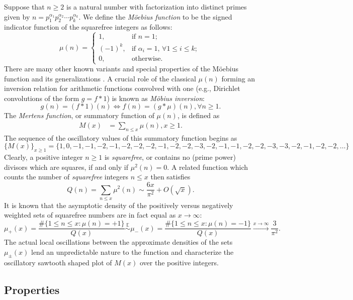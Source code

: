 \documentclass[11pt,reqno,a4letter]{article}
\numberwithin{figure}{section}
\numberwithin{table}{section}
\newcommand{\cf}{\textit{cf.\ }}
\newcommand{\seqnum}[1]{\href{http://oeis.org/#1}{\color{ProcessBlue}{\underline{#1}}}}
\theoremstyle{plain}
\numberwithin{theorem}{section}
\theoremstyle{definition}
\begin{document}
Suppose that $n \geq 2$ is a natural number with factorization into 
distinct primes given by 
$n = p_1^{\alpha_1} p_2^{\alpha_2} \cdots p_k^{\alpha_k}$. 
We define the \emph{M\"oebius function} to be the signed indicator function 
of the squarefree integers as follows: 
\[
\mu(n) = \begin{cases} 
     1, & \text{if $n = 1$; } \\ 
     (-1)^k, & \text{if $\alpha_i = 1$, $\forall 1 \leq i \leq k$; } \\ 
     0, & \text{otherwise.} 
     \end{cases} 
\]
There are many other known variants and special properties of the M\"oebius function 
and its generalizations \cite[\cf \S 2]{HANDBOOKNT-2004}. 
A crucial role of the classical $\mu(n)$ forming an inversion relation 
for arithmetic functions convolved with one (e.g., Dirichlet convolutions of the form $g = f \ast 1$) is 
known as \emph{M\"obius inversion}: 
\[
g(n) = (f \ast 1)(n) \iff f(n) = (g \ast \mu)(n), \forall n \geq 1. 
\]
The \emph{Mertens function}, or summatory function of $\mu(n)$, is defined as 
\begin{align*} 
M(x) & = \sum_{n \leq x} \mu(n), x \geq 1. 
\end{align*} 
The sequence of the oscillatory values of this summatory function begins as 
\cite[\seqnum{A002321}]{OEIS} 
\[
\{M(x)\}_{x \geq 1} = \{1, 0, -1, -1, -2, -1, -2, -2, -2, -1, -2, -2, -3, -2, 
     -1, -1, -2, -2, -3, -3, -2, -1, -2, -2, \ldots\}
\]
Clearly, a positive integer $n \geq 1$ is \emph{squarefree}, or contains no (prime power) divisors which are 
squares, if and only if $\mu^2(n) = 0$. 
A related function which counts the 
number of \emph{squarefree} integers $n \leq x$ then satisfies 
\cite[\seqnum{A013928}]{OEIS} 
\[ 
Q(n) = \sum_{n \leq x} \mu^2(n) \sim \frac{6x}{\pi^2} + O\left(\sqrt{x}\right). 
\] 
It is known that the asymptotic density of the positively versus negatively 
weighted sets of squarefree numbers are in fact equal as $x \rightarrow \infty$: 
\[
\mu_{+}(x) = \frac{\#\{1 \leq n \leq x: \mu(n) = +1\}}{Q(x)} \overset{\mathbb{E}}{\sim} 
     \mu_{-}(x) = \frac{\#\{1 \leq n \leq x: \mu(n) = -1\}}{Q(x)} 
     \xrightarrow{x \rightarrow \infty} \frac{3}{\pi^2}. 
\]
The actual local oscillations between the approximate densities of the sets 
$\mu_{\pm}(x)$ lend an unpredictable nature to the function and characterize the 
oscillatory sawtooth shaped plot of $M(x)$ over the positive integers. 

\subsection{Properties} 
\end{document}
